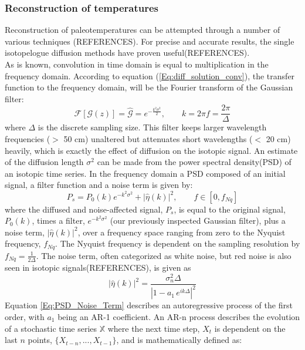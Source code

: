 \documentclass[../../CompleteThesis/Complete_1stDraft.tex]{subfiles}
\begin{document}
\subsubsection{Reconstruction of temperatures}
\label{Subsubsec:Ice_DiffusionAndDensification_Diffusion_TemperatureRecon}
Reconstruction of paleotemperatures can be attempted through a number of various techniques (REFERENCES). For precise and accurate results, the single isotopelogue diffusion methods have proven useful(REFERENCES).\\
As is known, convolution in time domain is equal to multiplication in the frequency domain. According to equation (\ref{Eq:diff_solution_conv}), the transfer function to the frequency domain, will be the Fourier transform of the Gaussian filter:
\begin{equation}
	\mathcal{F}[\mathcal{G}(z)] = \hat{\mathcal{G}} = e^{-\frac{k^2\sigma^2}{2}}, \qquad k = 2\pi f = \frac{2\pi}{\Delta}
	\label{Eq:Transer_Fct}
\end{equation} 
where $\Delta$ is the discrete sampling size. This filter keeps larger wavelength frequencies ($>$ 50 cm) unaltered but attenuates short wavelengths ($<$ 20 cm) heavily, which is exactly the effect of diffusion on the isotopic signal. An estimate of the diffusion length $\sigma^2$ can be made from the power spectral density(PSD) of an isotopic time series. In the frequency domain a PSD composed of an initial signal, a filter function and a noise term is given by:
\begin{equation}
	P_s = P_0(k) e^{-k^2\sigma^2} + |\hat{\eta}(k)|^2, \qquad f \in [0, f_{Nq}]
	\label{Eq:PSD_general}
\end{equation} 
where the diffused and noise-affected signal, $P_s$, is equal to the original signal, $P_0(k)$, times a filter, $e^{-k^2\sigma^2}$ (our previously inspected Gaussian filter), plus a noise term, $|\hat{\eta}(k)|^2$, over a frequency space ranging from zero to the Nyquist frequency, $f_{Nq}$. The Nyquist frequency is dependent on the sampling resolution by $f_{Nq} = \frac{1}{2\Delta}$.
The noise term, often categorized as white noise, but red noise is also seen in isotopic signals(REFERENCES), is given as
\begin{equation}
	|\hat{\eta}(k)|^2 = \frac{\sigma_n^2 \Delta}{|1 - a_1 \, e^{ik\Delta}|^2}
	\label{Eq:PSD_Noise_Term}
\end{equation}
Equation \ref{Eq:PSD_Noise_Term} describes an autoregressive process of the first order, with $a_1$ being an AR-1 coefficient. An AR-n process describes the evolution of a stochastic time series $\mathbb{X}$ where the next time step, $X_t$ is dependent on the last $n$ points, $\{X_{t-n},...,X_{t-1}\}$, and is mathematically defined as:
\end{document}
